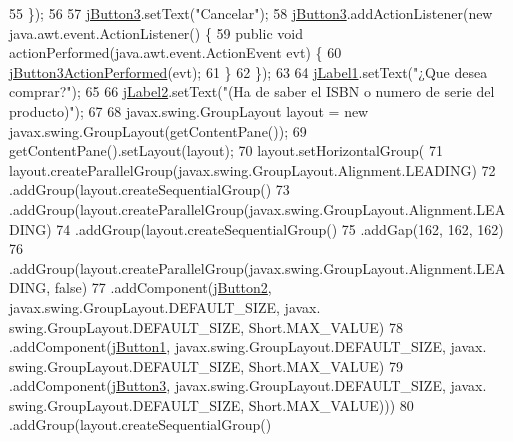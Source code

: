 \begin{DoxyCode}
55         \});
56 
57         \mbox{\hyperlink{class_interfaz_package_1_1_interfaz_comprar_addad0d7464d6b4d8ce1a868d0b289a13}{jButton3}}.setText(\textcolor{stringliteral}{"Cancelar"});
58         \mbox{\hyperlink{class_interfaz_package_1_1_interfaz_comprar_addad0d7464d6b4d8ce1a868d0b289a13}{jButton3}}.addActionListener(\textcolor{keyword}{new} java.awt.event.ActionListener() \{
59             \textcolor{keyword}{public} \textcolor{keywordtype}{void} actionPerformed(java.awt.event.ActionEvent evt) \{
60                 \mbox{\hyperlink{class_interfaz_package_1_1_interfaz_comprar_a4cbb42295fa843c3ba653fbe9a43ab1e}{jButton3ActionPerformed}}(evt);
61             \}
62         \});
63 
64         \mbox{\hyperlink{class_interfaz_package_1_1_interfaz_comprar_a59aeb61174932ff58c3f19f7e92450df}{jLabel1}}.setText(\textcolor{stringliteral}{"¿Que desea comprar?"});
65 
66         \mbox{\hyperlink{class_interfaz_package_1_1_interfaz_comprar_a3ae8bac05864b4e4109e88784240a350}{jLabel2}}.setText(\textcolor{stringliteral}{"(Ha de saber el ISBN o numero de serie del producto)"});
67 
68         javax.swing.GroupLayout layout = \textcolor{keyword}{new} javax.swing.GroupLayout(getContentPane());
69         getContentPane().setLayout(layout);
70         layout.setHorizontalGroup(
71             layout.createParallelGroup(javax.swing.GroupLayout.Alignment.LEADING)
72             .addGroup(layout.createSequentialGroup()
73                 .addGroup(layout.createParallelGroup(javax.swing.GroupLayout.Alignment.LEADING)
74                     .addGroup(layout.createSequentialGroup()
75                         .addGap(162, 162, 162)
76                         .addGroup(layout.createParallelGroup(javax.swing.GroupLayout.Alignment.LEADING, \textcolor{keyword}{
      false})
77                             .addComponent(\mbox{\hyperlink{class_interfaz_package_1_1_interfaz_comprar_a60c822302c1ba43e1ab6a812bfc0881b}{jButton2}}, javax.swing.GroupLayout.DEFAULT\_SIZE, javax.
      swing.GroupLayout.DEFAULT\_SIZE, Short.MAX\_VALUE)
78                             .addComponent(\mbox{\hyperlink{class_interfaz_package_1_1_interfaz_comprar_ab2d3c9abb855370537718c51d54c4a83}{jButton1}}, javax.swing.GroupLayout.DEFAULT\_SIZE, javax.
      swing.GroupLayout.DEFAULT\_SIZE, Short.MAX\_VALUE)
79                             .addComponent(\mbox{\hyperlink{class_interfaz_package_1_1_interfaz_comprar_addad0d7464d6b4d8ce1a868d0b289a13}{jButton3}}, javax.swing.GroupLayout.DEFAULT\_SIZE, javax.
      swing.GroupLayout.DEFAULT\_SIZE, Short.MAX\_VALUE)))
80                     .addGroup(layout.createSequentialGroup()

\end{DoxyCode}
